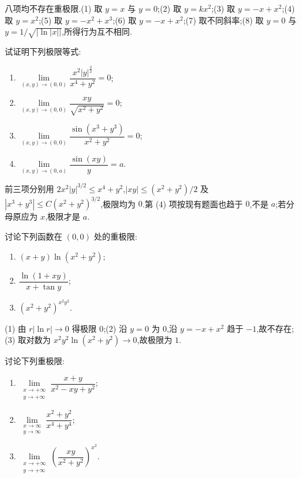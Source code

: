 \begin{solution}
    八项均不存在重极限.(1) 取 $y=x$ 与 $y=0$;(2) 取 $y=kx^2$;(3) 取 $y=-x+x^2$;(4) 取 $y=x^2$;(5) 取 $y=-x^2+x^3$;(6) 取 $y=-x+x^2$;(7) 取不同斜率;(8) 取 $y=0$ 与 $y=1/\sqrt{|\ln|x||}$,所得行为互不相同.
\end{solution}

\begin{example}
    试证明下列极限等式:
    \begin{enumerate}
        \item $\displaystyle\lim\limits_{(x,y)\to(0,0)}\dfrac{x^2|y|^{\frac{3}{2}}}{x^4+y^2}=0$;
        \item $\displaystyle\lim\limits_{(x,y)\to(0,0)}\dfrac{xy}{\sqrt{x^2+y^2}}=0$;
        \item $\displaystyle\lim\limits_{(x,y)\to(0,0)}\dfrac{\sin(x^3+y^3)}{x^2+y^2}=0$;
        \item $\displaystyle\lim\limits_{(x,y)\to(0,a)}\dfrac{\sin(xy)}{y}=a$.
    \end{enumerate}
\end{example}
\exampleblank

\begin{solution}
    前三项分别用 $2x^2|y|^{3/2}\leq x^4+y^2$,$|xy|\leq(x^2+y^2)/2$ 及 $|x^3+y^3|\leq C(x^2+y^2)^{3/2}$,极限均为 $0$.第 (4) 项按现有题面也趋于 $0$,不是 $a$;若分母原应为 $x$,极限才是 $a$.
\end{solution}

\begin{example}
    讨论下列函数在 $(0,0)$ 处的重极限:
    \begin{enumerate}
        \item $(x+y)\ln(x^2+y^2)$;
        \item $\displaystyle\dfrac{\ln(1+xy)}{x+\tan y}$;
        \item $(x^2+y^2)^{x^2y^2}$.
    \end{enumerate}
\end{example}
\exampleblank

\begin{solution}

    (1) 由 $r|\ln r|\to0$ 得极限 $0$;(2) 沿 $y=0$ 为 $0$,沿 $y=-x+x^2$ 趋于 $-1$,故不存在;(3) 取对数为 $x^2y^2\ln(x^2+y^2)\to0$,故极限为 $1$.
\end{solution}

\begin{example}
    讨论下列重极限:
    \begin{enumerate}
        \item $\displaystyle\lim\limits_{\substack{x\to+\infty\\y\to+\infty}}\dfrac{x+y}{x^2-xy+y^2}$;
        \item $\displaystyle\lim\limits_{\substack{x\to\infty\\y\to\infty}}\dfrac{x^2+y^2}{x^4+y^4}$;
        \item $\displaystyle\lim\limits_{\substack{x\to+\infty\\y\to+\infty}}\left(\dfrac{xy}{x^2+y^2}\right)^{x^2}$.
    \end{enumerate}
\end{example}
\exampleblank

